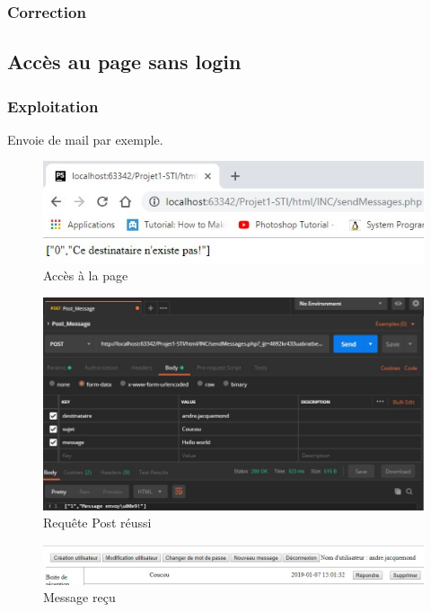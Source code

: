 \documentclass[12pt]{article}
\begin{document}
\subsubsection{Correction}


\subsection{Accès au page sans login}
\subsubsection{Exploitation}
Envoie de mail par exemple.
\begin{figure}[H]
\centering
\includegraphics{images/withoutLogin.jpg}
\caption{Accès à la page}
\end{figure}
\begin{figure}[H]
\centering
\includegraphics[width=\linewidth]{images/postmanSendMessage.jpg}
\caption{Requête Post réussi}
\end{figure}
\begin{figure}[H]
\centering
\includegraphics[width=\linewidth]{images/postmanSendMessageSuccess.jpg}
\caption{Message reçu}
\end{figure}
\end{document}
